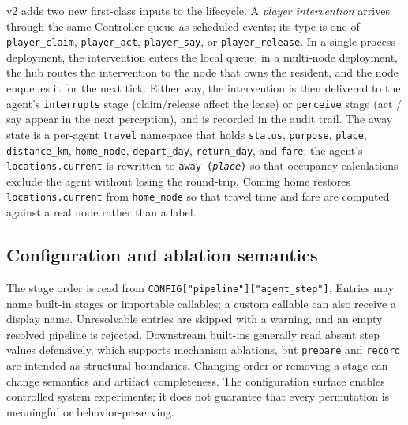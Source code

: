v2 adds two new first-class inputs to the lifecycle.  A \emph{player
intervention} arrives through the same Controller queue as scheduled events;
its type is one of \texttt{player\_claim}, \texttt{player\_act},
\texttt{player\_say}, or \texttt{player\_release}.  In a single-process
deployment, the intervention enters the local queue; in a multi-node
deployment, the hub routes the intervention to the node that owns the
resident, and the node enqueues it for the next tick.  Either way, the
intervention is then delivered to the agent's \texttt{interrupts} stage
(claim/release affect the lease) or \texttt{perceive} stage (act / say
appear in the next perception), and is recorded in the audit trail.  The
away state is a per-agent \texttt{travel} namespace that holds
\texttt{status}, \texttt{purpose}, \texttt{place}, \texttt{distance\_km},
\texttt{home\_node}, \texttt{depart\_day}, \texttt{return\_day}, and
\texttt{fare}; the agent's \texttt{locations.current} is rewritten to
\texttt{away (\textit{place})} so that occupancy calculations exclude the
agent without losing the round-trip.  Coming home restores
\texttt{locations.current} from \texttt{home\_node} so that travel time and
fare are computed against a real node rather than a label.

\subsection{Configuration and ablation semantics}

The stage order is read from \texttt{CONFIG["pipeline"]["agent\_step"]}.
Entries may name built-in stages or importable callables; a custom callable
can also receive a display name.  Unresolvable entries are skipped with a
warning, and an empty resolved pipeline is rejected.  Downstream built-ins
generally read absent step values defensively, which supports mechanism
ablations, but \texttt{prepare} and \texttt{record} are intended as
structural boundaries.  Changing order or removing a stage can change
semantics and artifact completeness.  The configuration surface enables
controlled system experiments; it does not guarantee that every permutation
is meaningful or behavior-preserving.
